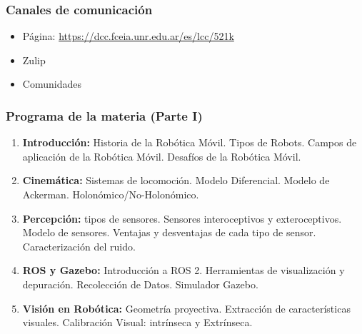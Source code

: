 \begin{frame}
	\frametitle{Canales de comunicación}
	\footnotesize
	\begin{itemize}
		\item Página: \href{https://dcc.fceia.unr.edu.ar/es/lcc/521k}{https://dcc.fceia.unr.edu.ar/es/lcc/521k}
		\item Zulip
		\item Comunidades
	\end{itemize}
\end{frame}

\begin{frame}
	\frametitle{Programa de la materia (Parte I)}
	\footnotesize
	\begin{enumerate}
		\item {\bf Introducción:} Historia de la Robótica Móvil. Tipos de Robots. Campos de aplicación de la Robótica Móvil. Desafíos de la Robótica Móvil.
		
		\item {\bf Cinemática:} Sistemas de locomoción. Modelo Diferencial. Modelo de Ackerman. Holonómico/No-Holonómico.
		
		\item {\bf Percepción:} tipos de sensores. Sensores interoceptivos y exteroceptivos. Modelo de sensores. Ventajas y desventajas de cada tipo de sensor. Caracterización del ruido.
		
		\item {\bf ROS y Gazebo:} Introducción a ROS 2. Herramientas de visualización y depuración. Recolección de Datos. Simulador Gazebo.
		
		\item {\bf Visión en Robótica:} Geometría proyectiva. Extracción de características visuales. Calibración Visual: intrínseca y Extrínseca. 
		
	\end{enumerate}

\end{frame}

